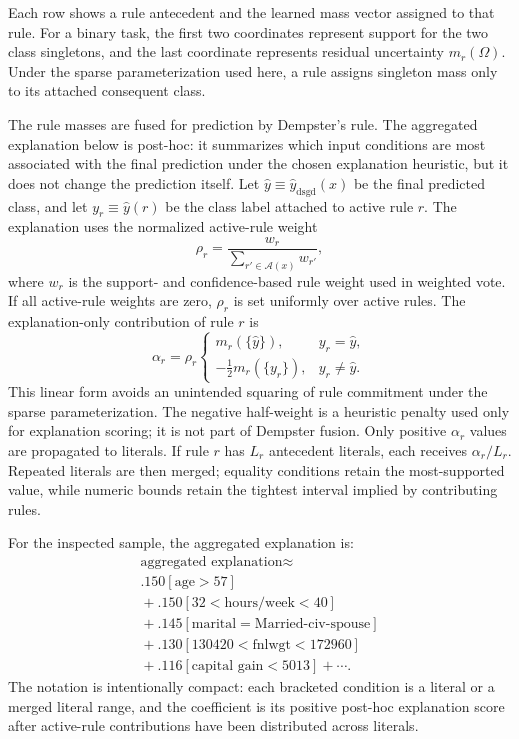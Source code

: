 \documentclass[conference]{IEEEtran}
\begin{document}
Each row shows a rule antecedent and the learned mass vector assigned to that rule. For a binary task, the first two coordinates represent support for the two class singletons, and the last coordinate represents residual uncertainty $m_r(\Omega)$. Under the sparse parameterization used here, a rule assigns singleton mass only to its attached consequent class.

The rule masses are fused for prediction by Dempster's rule. The aggregated explanation below is post-hoc: it summarizes which input conditions are most associated with the final prediction under the chosen explanation heuristic, but it does not change the prediction itself. Let $\hat{y}\equiv\hat{y}_{\mathrm{dsgd}}(x)$ be the final predicted class, and let $y_r\equiv\hat{y}(r)$ be the class label attached to active rule $r$. The explanation uses the normalized active-rule weight
\[
  \rho_r=\frac{w_r}{\sum_{r'\in\mathcal{A}(x)}w_{r'}},
\]
where $w_r$ is the support- and confidence-based rule weight used in weighted vote. If all active-rule weights are zero, $\rho_r$ is set uniformly over active rules. The explanation-only contribution of rule $r$ is
\[
  \alpha_r=\rho_r
  \begin{cases}
    m_r(\{\hat{y}\}), & y_r=\hat{y},\\[2pt]
    -\tfrac{1}{2}m_r(\{y_r\}), & y_r\neq\hat{y}.
  \end{cases}
\]
This linear form avoids an unintended squaring of rule commitment under the sparse parameterization. The negative half-weight is a heuristic penalty used only for explanation scoring; it is not part of Dempster fusion. Only positive $\alpha_r$ values are propagated to literals. If rule $r$ has $L_r$ antecedent literals, each receives $\alpha_r/L_r$. Repeated literals are then merged; equality conditions retain the most-supported value, while numeric bounds retain the tightest interval implied by contributing rules.

For the inspected sample, the aggregated explanation is:
\begin{equation*}
\begin{gathered}
\text{aggregated explanation}\approx \\
.150[\text{age} > 57] \\
{}+ .150[32 < \text{hours/week} < 40] \\
{}+ .145[\text{marital} = \text{Married-civ-spouse}] \\
{}+ .130[130420 < \text{fnlwgt} < 172960] \\
{}+ .116[\text{capital gain} < 5013] + \cdots .
\end{gathered}
\end{equation*}
The notation is intentionally compact: each bracketed condition is a literal or a merged literal range, and the coefficient is its positive post-hoc explanation score after active-rule contributions have been distributed across literals.
\end{document}
